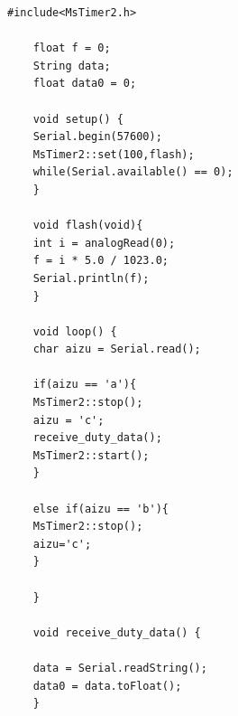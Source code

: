 \documentclass[12pt]{jarticle}
\begin{document}
	\begin{lstlisting}[caption=受電側arduino, label=program3]
	#include<MsTimer2.h>
	
	float f = 0;
	String data;
	float data0 = 0;
	
	void setup() {
	Serial.begin(57600);
	MsTimer2::set(100,flash);
	while(Serial.available() == 0);
	}
	
	void flash(void){
	int i = analogRead(0);
	f = i * 5.0 / 1023.0;
	Serial.println(f);
	}
	
	void loop() {
	char aizu = Serial.read();
	
	if(aizu == 'a'){
	MsTimer2::stop();
	aizu = 'c';
	receive_duty_data();
	MsTimer2::start();
	}
	
	else if(aizu == 'b'){
	MsTimer2::stop();
	aizu='c';
	}
	
	}
	
	void receive_duty_data() {
	
	data = Serial.readString();
	data0 = data.toFloat();
	}
	\end{lstlisting}
\end{document}
